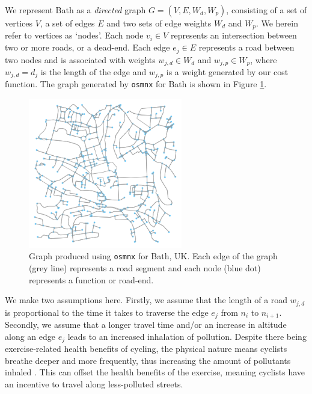 \documentclass[11pt]{report}
\begin{document}
We represent Bath as a \textit{directed} graph $G = (V, E, W_d, W_p)$, consisting of a set of vertices $V$, a set of edges $E$ and two sets of edge weights $W_d$ and $W_p$. We herein refer to vertices as `nodes'. Each node $v_i \in V$ represents an intersection between two or more roads, or a dead-end. Each edge $e_j \in E$ represents a road between two nodes and is associated with weights $w_{j, d} \in W_d$ and $w_{j, p} \in W_p$, where $w_{j, d} = d_j$ is the length of the edge and $w_{j, p}$ is a weight generated by our cost function. The graph generated by \texttt{osmnx} for Bath is shown in Figure \ref{fig:network_graph}.

\begin{figure}[!tb]
\centering
\includegraphics[width=0.6\textwidth]{images/network_graph}
\caption[\texttt{osmnx} graph for Bath.]{Graph produced using \texttt{osmnx} for Bath, UK. Each edge of the graph (grey line) represents a road segment and each node (blue dot) represents a function or road-end.}
\label{fig:network_graph}
\end{figure}

We make two assumptions here. Firstly, we assume that the length of a road $w_{j, d}$ is proportional to the time it takes to traverse the edge $e_j$ from $n_i$ to $n_{i+1}$. Secondly, we assume that a longer travel time and/or an increase in altitude along an edge $e_j$ leads to an increased inhalation of pollution. Despite there being exercise-related health benefits of cycling, the physical nature means cyclists breathe deeper and more frequently, thus increasing the amount of pollutants inhaled \citep{bigazzi2014reviewintake, Ramos2016inhaleddose}. This can offset the health benefits of the exercise, meaning cyclists have an incentive to travel along less-polluted streets.
\end{document}
